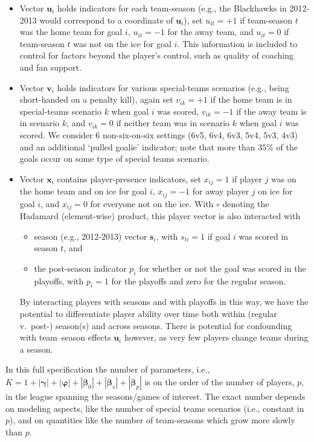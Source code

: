 \begin{itemize}
\item Vector $\mathbf{u}_i$ holds indicators for each team-season (e.g., the Blackhawks in 2012-2013 would correspond to a coordinate of $\mathbf{u}_i$), set 
$u_{it}=+1$ if team-season $t$ was the home team for goal $i$, $u_{it}=-1$ for the away team, and $u_{it}=0$ if team-season $t$ was not on the ice for goal $i$.  This information is included to control for factors beyond the player's control, such as quality of coaching and fan support.
\item Vector $\mathbf{v}_i$ holds indicators for various special-teams scenarios (e.g., being short-handed on a penalty kill), again set $v_{ik}=+1$ if the home team is in special-teams scenario $k$ when goal $i$ was scored, $v_{ik}=-1$ if the away team is in scenario $k$, and $v_{ik}=0$ if neither team was in scenario $k$ when goal $i$ was scored.  We consider $6$ non-six-on-six settings (6v5, 6v4, 6v3, 5v4, 5v3, 4v3) and an additional `pulled goalie' indicator; note that more than $35\%$ of the goals occur on some type of special teams scenario. 
\item Vector
$\mathbf{x}_i$ contains player-presence indicators, set $x_{ij}=1$ if player $j$ was on the
home team and on ice for goal $i$, $x_{ij}=-1$ for away player $j$ on ice for
goal $i$, and $x_{ij}=0$ for everyone not on the ice. With $\circ$ denoting the Hadamard (element-wise) product, this player vector is also interacted with 
\begin{itemize}
\item  season (e.g., 2012-2013) vector $\mathbf{s}_i$, with $s_{ti} = 1$ if goal $i$ was scored in season $t$, and
\item the post-season indicator $p_i$  for whether or not the goal was scored in the playoffs, with $p_{i} =1$ for the playoffs and zero for the regular season.
\end{itemize}  
By interacting players with seasons and with playoffs in this way, we have the
potential to differentiate player ability over time both within (regular
v.~post-) season(s) and across seasons.  There is potential for confounding
with team--season effects $\mathbf{u}_i$ however, as very few players change
teams during a season.

\end{itemize}
In this full specification the number of parameters, i.e., $K = 1 +
|\boldsymbol{\gamma}|+ | \boldsymbol{\varphi}| + |\boldsymbol{\beta}_0| +
|\boldsymbol{\beta}_s| + |\boldsymbol{\beta}_p|$ is on the order of the number
of players, $p$, in the league spanning the seasons/games of interest.  The
exact number depends on modeling aspects, like the number of special teams
scenarios (i.e., constant in $p$), and on quantities like the number of
team-seasons which grow more slowly than $p$.

